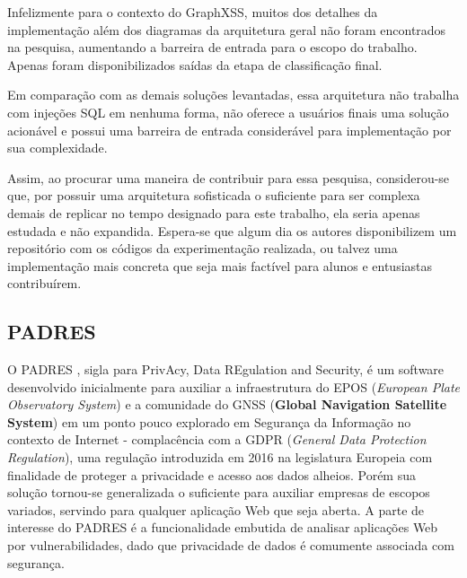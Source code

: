 Infelizmente para o contexto do GraphXSS, muitos dos detalhes da implementação além dos diagramas da arquitetura geral não foram encontrados na pesquisa, aumentando a barreira de entrada para o escopo do trabalho. Apenas foram disponibilizados saídas da etapa de classificação final. 

Em comparação com as demais soluções levantadas, essa arquitetura não trabalha com injeções SQL em nenhuma forma, não oferece a usuários finais uma solução acionável e possui uma barreira de entrada considerável para implementação por sua complexidade.


Assim, ao procurar uma maneira de contribuir para essa pesquisa, considerou-se que, por possuir uma arquitetura sofisticada o suficiente para ser complexa demais de replicar no tempo designado para este trabalho, ela seria apenas estudada e não expandida. Espera-se que algum dia os autores disponibilizem um repositório com os códigos da experimentação realizada, ou talvez uma implementação mais concreta que seja mais factível para alunos e entusiastas contribuírem.

\subsection{PADRES}

O PADRES \cite{pereira_padres_2022}, sigla para PrivAcy, Data REgulation and Security, é um software desenvolvido inicialmente para auxiliar a infraestrutura do EPOS (\textit{European Plate Observatory System}) e a comunidade do GNSS (\textbf{Global Navigation Satellite System}) em um ponto pouco explorado em Segurança da Informação no contexto de Internet - complacência com a GDPR (\textit{General Data Protection Regulation}), uma regulação introduzida em 2016 na legislatura Europeia com finalidade de proteger a privacidade e acesso aos dados alheios. Porém sua solução tornou-se generalizada o suficiente para auxiliar empresas de escopos variados, servindo para qualquer aplicação Web que seja aberta. A parte de interesse do PADRES é a funcionalidade embutida de analisar aplicações Web por vulnerabilidades, dado que privacidade de dados é comumente associada com segurança.

